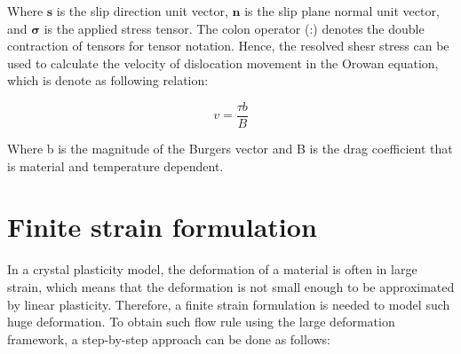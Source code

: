 \documentclass[12pt]{article}
\begin{document}
Where $\boldsymbol{s}$ is the slip direction unit vector, $\boldsymbol{n}$ is the 
slip plane normal unit vector, and $\boldsymbol{\sigma}$ is the applied stress tensor. 
The colon operator (:) denotes the double contraction of tensors for tensor notation. Hence, the resolved shesr stress
can be used to calculate the velocity of dislocation movement in the Orowan equation, which is denote as following 
relation:

\begin{equation}
    v = \frac{\tau b}{B}
\end{equation}

Where b is the magnitude of the Burgers vector and B is the drag coefficient that is material and temperature
dependent. 


\section{Finite strain formulation}
\hspace{2em}In a crystal plasticity model, the deformation of a material is often in large strain,
which means that the deformation is not small enough to be approximated by linear plasticity. Therefore, a finite strain
formulation is needed to model such huge deformation. To obtain such flow rule using the large deformation framework, a step-by-step
approach can be done as follows:
\end{document}

